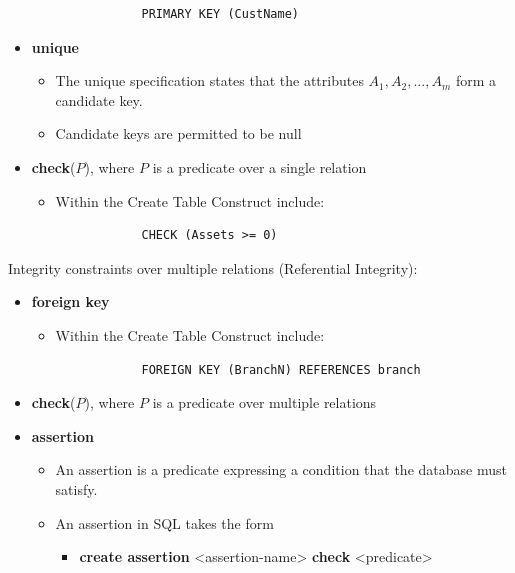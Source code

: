 \begin{itemize}
\begin{itemize}
\begin{lstlisting}
            PRIMARY KEY (CustName)
        \end{lstlisting}
    \end{itemize}
    \item \textbf{unique}
    \begin{itemize}
        \item The unique specification states that the attributes $A_1,A_2,...,A_m$ form a candidate key.
        \item Candidate keys are permitted to be null 
    \end{itemize}
    \item \textbf{check}($P$), where $P$ is a predicate over a single relation 
    \begin{itemize}
        \item Within the Create Table Construct include: \begin{lstlisting}
            CHECK (Assets >= 0)
        \end{lstlisting}
    \end{itemize}
\end{itemize}

Integrity constraints over multiple relations (Referential Integrity):
\begin{itemize}
    \item \textbf{foreign key}
    \begin{itemize}
        \item Within the Create Table Construct include:
        \begin{lstlisting}
            FOREIGN KEY (BranchN) REFERENCES branch
        \end{lstlisting}
    \end{itemize}
    \item \textbf{check}($P$), where $P$ is a predicate over multiple relations
    \item \textbf{assertion}
    \begin{itemize}
        \item An assertion is a predicate expressing a condition that the database must satisfy.
        \item An assertion in SQL takes the form
        \begin{itemize}
            \item[] \textbf{create assertion} <assertion-name> \textbf{check} <predicate>
        \end{itemize}
    \end{itemize}
\end{itemize}
